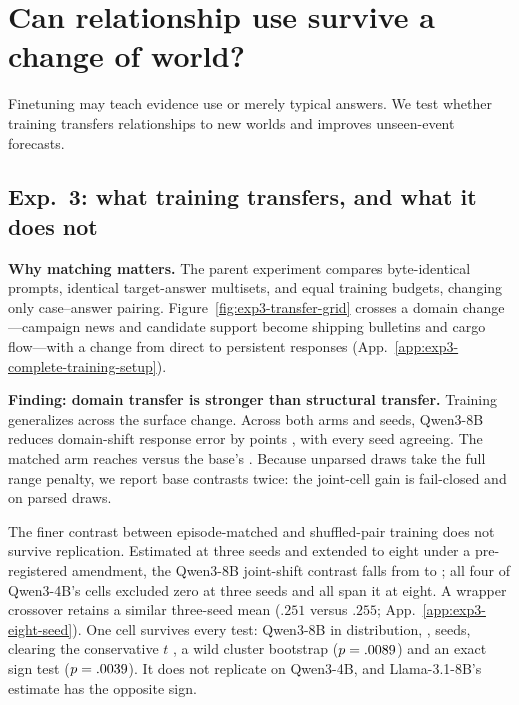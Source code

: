 \section{Can relationship use survive a change of world?}
\label{sec:transfer}

Finetuning may teach evidence use or merely typical answers. We test whether
training transfers relationships to new worlds and improves unseen-event forecasts.

\subsection{Exp.~3: what training transfers, and what it does not}
\label{sec:exp3}


\newcommand{\transfergridlines}{15}


\textbf{Why matching matters.}
The parent experiment compares byte-identical prompts, identical target-answer
multisets, and equal training budgets, changing only case--answer pairing.
Figure~\ref{fig:exp3-transfer-grid} crosses a domain change---campaign news and
candidate support become shipping bulletins and cargo flow---with a change
from direct to persistent responses (App.~\ref{app:exp3-complete-training-setup}).

\noindent\textbf{Finding: domain transfer is stronger than structural transfer.}
Training generalizes across the surface change. Across both arms and
\eEightG{} seeds, Qwen3-8B reduces domain-shift response error by
\eEightDomainBaseGain{} points \eEightDomainBaseGainCi{}, with every seed agreeing.
The matched arm reaches \eEightDomainMatched{} versus the base's
\eEightDomainBase{}.
Because unparsed draws take the full
range penalty, we report base contrasts twice: the joint-cell gain is
\eEightJointBaseGain{} \eEightJointBaseGainCi{} fail-closed and
\eEightJointBaseGainParsed{} \eEightJointBaseGainParsedCi{} on parsed draws.



The finer contrast between episode-matched and shuffled-pair training does not
survive replication. Estimated at three seeds and extended to eight under a
pre-registered amendment, the Qwen3-8B joint-shift contrast falls from
\ePubEightJointEst{} \ePubEightJointCi{} to \eEightJointEst{} \eEightJointCi{};
all four of Qwen3-4B's cells excluded zero at three seeds and all span it at
eight. A wrapper crossover retains a similar three-seed mean ($.251$ versus $.255$;
App.~\ref{app:exp3-eight-seed}). One cell survives every test: Qwen3-8B in distribution,
\eEightIdEst{} \eEightIdCi{}, \eEightIdSign{} seeds, clearing the conservative
$t$ \eEightIdTci{}, a wild cluster bootstrap ($p=.0089{}$) and an exact
sign test ($p=.0039{}$). It does not replicate on Qwen3-4B, and
Llama-3.1-8B's estimate has the opposite sign.

